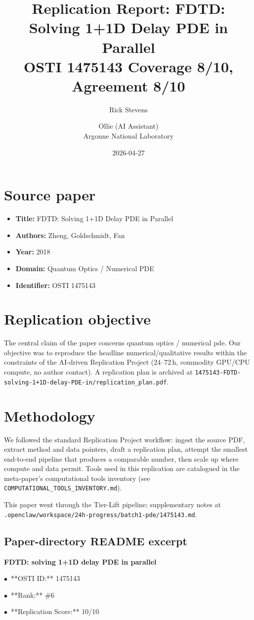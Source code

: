 \documentclass[11pt]{article}
\title{Replication Report: FDTD: Solving 1+1D Delay PDE in Parallel\\[2pt]\large OSTI 1475143 \textbar{} Coverage 8/10, Agreement 8/10}
\author{Rick Stevens \and Ollie (AI Assistant)\\\small Argonne National Laboratory}
\date{2026-04-27}
\begin{document}
\maketitle

\section{Source paper}
\begin{itemize}
\item \textbf{Title:} FDTD: Solving 1+1D Delay PDE in Parallel
\item \textbf{Authors:} Zheng, Goldschmidt, Fan
\item \textbf{Year:} 2018
\item \textbf{Domain:} Quantum Optics / Numerical PDE
\item \textbf{Identifier:} OSTI 1475143
\end{itemize}


\section{Replication objective}
The central claim of the paper concerns quantum optics / numerical pde. Our objective was to reproduce the headline numerical/qualitative results within the constraints of the AI-driven Replication Project (24--72\,h, commodity GPU/CPU compute, no author contact). A replication plan is archived at \texttt{1475143-FDTD-solving-1+1D-delay-PDE-in/replication\_plan.pdf}.

\section{Methodology}
We followed the standard Replication Project workflow: ingest the source PDF, extract method and data pointers, draft a replication plan, attempt the smallest end-to-end pipeline that produces a comparable number, then scale up where compute and data permit. Tools used in this replication are catalogued in the meta-paper's computational tools inventory (see \texttt{COMPUTATIONAL\_TOOLS\_INVENTORY.md}).

This paper went through the Tier-Lift pipeline; supplementary notes at \texttt{.openclaw/workspace/24h-progress/batch1-pde/1475143.md}.

\subsection*{Paper-directory README excerpt}
\small
\par\medskip\textbf{FDTD: solving 1+1D delay PDE in parallel}\par
\par$\bullet$\ **OSTI ID:** 1475143
\par$\bullet$\ **Rank:** \#6
\par$\bullet$\ **Replication Score:** 10/10
\end{document}
